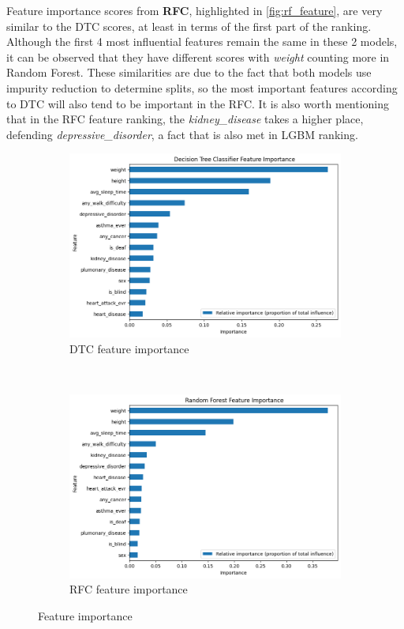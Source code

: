 \documentclass[runningheads]{llncs}
\begin{document}
Feature importance scores from \textbf{RFC}, highlighted in \autoref{fig:rf_feature}, are very similar to the DTC scores, at least in terms of the first part of the ranking. Although the first 4 most influential features remain the same in these 2 models, it can be observed that they have different scores with \textit{weight} counting more in Random Forest. These similarities are due to the fact that both models use impurity reduction to determine splits, so the most important features according to DTC will also tend to be important in the RFC. It is also worth mentioning that in the RFC feature ranking, the \textit{kidney\_disease} takes a higher place, defending \textit{depressive\_disorder}, a fact that is also met in LGBM ranking.

\begin{figure}[htbp]
    \centering
    \begin{subfigure}[t]{0.48\textwidth}
        \centering
        \includegraphics[width=0.99\linewidth]{images/DT_fi.png}
        \caption{DTC feature importance}
        \label{fig:DT_feature}
    \end{subfigure}%
    ~ 
    \begin{subfigure}[t]{0.48\textwidth}
        \centering
        \includegraphics[width=0.99\linewidth]{images/rf_fi.png}
        \caption{RFC feature importance}
        \label{fig:rf_feature}
    \end{subfigure}
    \caption{Feature importance}
\end{figure}
\end{document}
